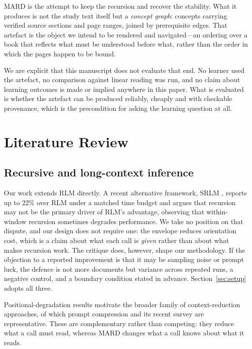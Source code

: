 \documentclass[conference]{IEEEtran}
\begin{document}
MARD is the attempt to keep the recursion and recover the stability. What it
produces is not the study text itself but a \emph{concept graph}: concepts
carrying verified source sections and page ranges, joined by prerequisite
edges. That artefact is the object we intend to be rendered and navigated---an
ordering over a book that reflects what must be understood before what,
rather than the order in which the pages happen to be bound.

We are explicit that this manuscript does not evaluate that end. No learner
used the artefact, no comparison against linear reading was run, and no claim
about learning outcomes is made or implied anywhere in this paper. What is
evaluated is whether the artefact can be produced reliably, cheaply and with
checkable provenance, which is the precondition for asking the learning
question at all.

\section{Literature Review}
\label{sec:related}

\subsection{Recursive and long-context inference}
Our work extends RLM \cite{zhang2025rlm} directly. A recent alternative
framework, SRLM \cite{alizadeh2026srlm}, reports up to \num{22}\% over RLM
under a matched time budget and argues that recursion may not be the primary
driver of RLM's advantage, observing that within-window
recursion sometimes degrades performance. We take no position on that
dispute, and our design does not require one: the envelope reduces
orientation cost, which is a claim about what each call is \emph{given}
rather than about what makes recursion work. The critique does, however,
shape our methodology. If the objection to a reported improvement is that it
may be sampling noise or prompt luck, the defence is not more documents but
variance across repeated runs, a negative control, and a boundary condition
stated in advance. Section~\ref{sec:setup} adopts all three.

Positional-degradation results \cite{liu2024lost} motivate the broader family
of context-reduction approaches, of which prompt compression
\cite{jiang2023llmlingua,pan2024llmlingua2,li2023compressing} and its recent
survey \cite{li2025survey} are representative. These are complementary rather
than competing: they reduce what a call must read, whereas MARD changes what
a call knows about what it reads.
\end{document}
